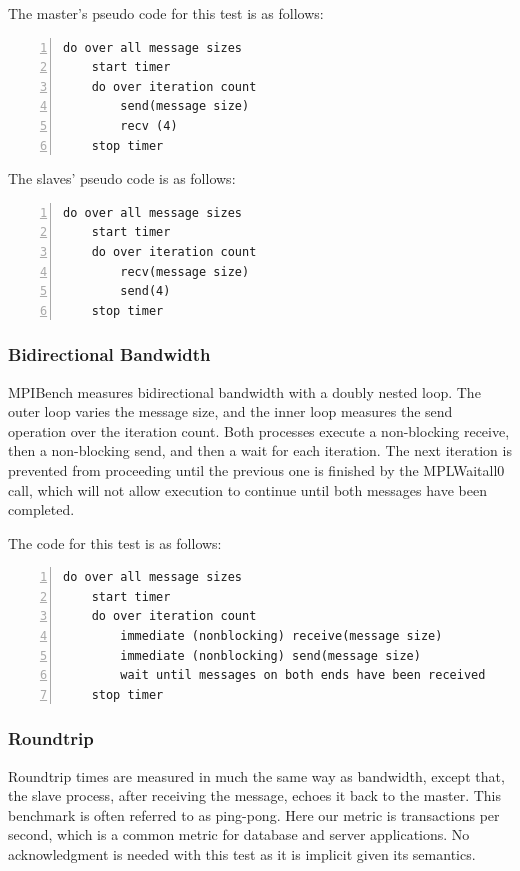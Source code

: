 The master's pseudo code for this test is as follows:

\begin{lstlisting}[frame=single,numbers=left]
do over all message sizes 
    start timer
    do over iteration count 
        send(message size) 
        recv (4)
    stop timer
\end{lstlisting}

The slaves' pseudo code is as follows:

\begin{lstlisting}[frame=single,numbers=left]
do over all message sizes 
    start timer
    do over iteration count 
        recv(message size) 
        send(4)
    stop timer
\end{lstlisting}

\subsubsection{Bidirectional Bandwidth}

MPIBench measures bidirectional bandwidth with a doubly nested loop. The outer
loop varies the message size, and the inner loop measures the send operation
over the iteration count. Both processes execute a non-blocking receive, then a
non-blocking send, and then a wait for each iteration. The next iteration is
prevented from proceeding until the previous one is finished by the MPLWaitall0
call, which will not allow execution to continue until both messages have been
completed.

The code for this test is as follows:
 
\begin{lstlisting}[frame=single,numbers=left]
 do over all message sizes
    start timer
    do over iteration count
        immediate (nonblocking) receive(message size)
        immediate (nonblocking) send(message size)
        wait until messages on both ends have been received
    stop timer
\end{lstlisting}


\subsubsection{Roundtrip}

Roundtrip times are measured in much the same way as bandwidth, except that,
the slave process, after receiving the message, echoes it back to the master.
This benchmark is often referred to as ping-pong. Here our metric is
transactions per second, which is a common metric for database and server
applications. No acknowledgment is needed with this test as it is implicit
given its semantics.

